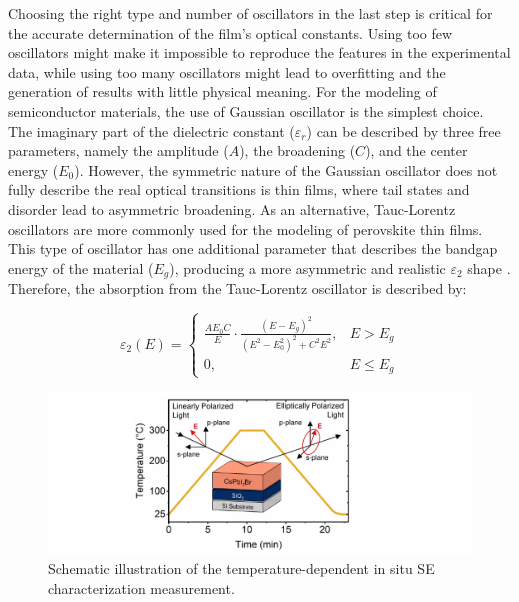 Choosing the right type and number of oscillators in the last step is critical for the accurate determination of the film's optical constants. Using too few oscillators might make it impossible to reproduce the features in the experimental data, while using too many oscillators might lead to overfitting and the generation of results with little physical meaning. For the modeling of semiconductor materials, the use of Gaussian oscillator is the simplest choice. The imaginary part of the dielectric constant ($\varepsilon_r$) can be described by three free parameters, namely the amplitude ($A$), the broadening ($C$), and the center energy ($E_0$). However, the symmetric nature of the Gaussian oscillator does not fully describe the real optical transitions is thin films, where tail states and disorder lead to asymmetric broadening. As an alternative, Tauc-Lorentz oscillators are more commonly used for the modeling of perovskite thin films. This type of oscillator has one additional parameter that describes the bandgap energy of the material ($E_g$), producing a more asymmetric and realistic $\varepsilon_2$ shape \cite{Jellison1996ParameterizationRegion}. Therefore, the absorption from the Tauc-Lorentz oscillator is described by: 

\begin{equation}
\varepsilon_2(E) =
\begin{cases}
\frac{A E_0 C}{E} \cdot \frac{(E - E_g)^2}{(E^2 - E_0^2)^2 + C^2 E^2}, & E > E_g \\
0, & E \leq E_g
\end{cases}
\label{eq:tauc_lorentz}
\end{equation}

\begin{figure}[tbp]
  \centering
  \medskip
  \includegraphics[width=.99\textwidth]{chapters/ellipsometry/image/experiment_description.pdf}
  \caption{Schematic illustration of the temperature-dependent in situ SE characterization measurement.}
  \label{fig:ellipsometry:experiment_description}
\end{figure}



